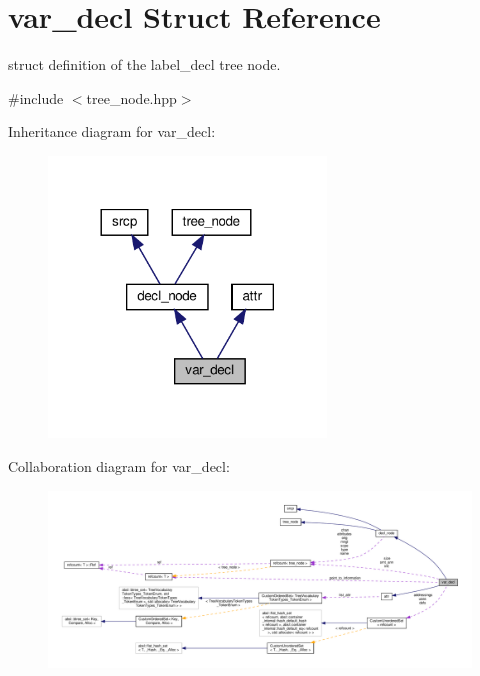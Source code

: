 \hypertarget{structvar__decl}{}\section{var\+\_\+decl Struct Reference}
\label{structvar__decl}


struct definition of the label\+\_\+decl tree node.  




{\ttfamily \#include $<$tree\+\_\+node.\+hpp$>$}



Inheritance diagram for var\+\_\+decl\+:
\nopagebreak
\begin{figure}[H]
\begin{center}
\leavevmode
\includegraphics[width=209pt]{d9/dd0/structvar__decl__inherit__graph}
\end{center}
\end{figure}


Collaboration diagram for var\+\_\+decl\+:
\nopagebreak
\begin{figure}[H]
\begin{center}
\leavevmode
\includegraphics[width=350pt]{de/d5a/structvar__decl__coll__graph}
\end{center}
\end{figure}
